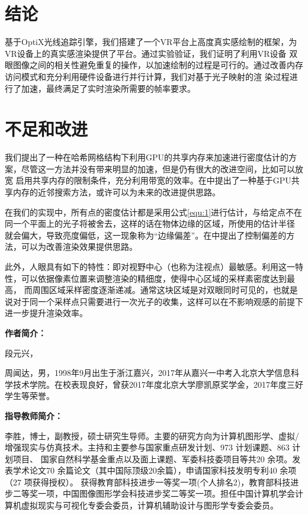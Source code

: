 \documentclass[UTF8]{ctexart}
\begin{document}
\section{结论}
    基于OptiX光线追踪引擎，我们搭建了一个VR平台上高度真实感绘制的框架，为VR设备上的真实感渲染提供了平台。通过实验验证，我们证明了利用VR设备
    双眼图像之间的相关性避免重复的操作，以加速绘制的过程是可行的。通过改善内存访问模式和充分利用硬件设备进行并行计算，我们对基于光子映射的渲
    染过程进行了加速，最终满足了实时渲染所需要的帧率要求。

\section{不足和改进}
    我们提出了一种在哈希网格结构下利用GPU的共享内存来加速进行密度估计的方案，尽管这一方法并没有带来明显的加速，但是仍有很大的改进空间，比如可以放宽
    启用共享内存的限制条件，充分利用带宽的效率。在\cite{gross2019fast}中提出了一种基于GPU共享内存的近邻搜索方法，或许可以为未来的改进提供思路。

    在我们的实现中，所有点的密度估计都是采用公式\ref{equ:1}进行估计，与给定点不在同一个平面上的光子将被舍去，这样的话在物体边缘的区域，所使用的估计半径
    就会偏大，导致亮度偏低，这一现象称为“边缘偏差”。在\cite{biasControl}中提出了控制偏差的方法，可以为改善渲染效果提供思路。

    此外，人眼具有如下的特性：即对视野中心（也称为注视点\cite{Guenter2012Foveated}）最敏感。利用这一特性，可以依据像素位置来调整渲染的精细度，使得中心区域的采样素密度达到最高，
    而周围区域采样密度逐渐递减。通常这块区域是对双眼同时可见的，也就是说对于同一个采样点只需要进行一次光子的收集，这样可以在不影响观感的前提下进一步提升渲染效率。


\noindent\textbf{作者简介：}

    段元兴，

    周闻达，男，1998年9月出生于浙江嘉兴，2017年从嘉兴一中考入北京大学信息科学技术学院。在校表现良好，曾获2017年度北京大学廖凯原奖学金，2017年度三好学生等荣誉。

\noindent\textbf{指导教师简介：}

    李胜，博士，副教授，硕士研究生导师。主要的研究方向为计算机图形学、虚拟/增强现实与仿真技术。主持和主要参与国家重点研发计划、973 计划课题、863 计划项目、
    国家自然科学基金重点以及面上课题、军委科技委项目等共20 余项。发表学术论文70 余篇论文（其中国际顶级20余篇），申请国家科技发明专利40 余项（27 项获得授权）。
    获得教育部科技进步一等奖一项(个人排名2)，教育部科技进步二等奖一项，中国图像图形学会科技进步奖二等奖一项。担任中国计算机学会计算机虚拟现实与可视化专委会委员，计算机辅助设计与图形学专委会委员。
\end{document}

